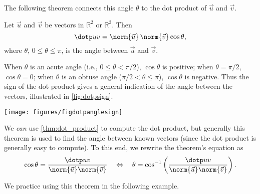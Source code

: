 The following theorem connects this angle $\theta$ to the dot product of $\vec u$ and $\vec v$.

{Let $\vec u$ and $\vec v$ be vectors in $\mathbb{R}^2$ or $\mathbb{R}^3$. Then 
$$\dotp uv = \norm{\vec u}\,\norm{\vec v} \cos\theta,$$
where $\theta$, $0\leq\theta\leq \pi$, is the angle between $\vec u$ and $\vec v$.
}

When $\theta$ is an acute angle (i.e., $0\leq \theta <\pi/2$), $\cos \theta$ is positive; when $\theta = \pi/2$, $\cos \theta = 0$; when $\theta$ is an obtuse angle ($\pi/2<\theta \leq \pi$), $\cos \theta$ is negative. Thus the sign of the dot product gives a general indication of the angle between the vectors, illustrated in \autoref{fig:dotpsign}.

\begin{lxfigure}
\begin{center}
\texttt{[image: figures/figdotpanglesign]}
\label{fig:dotpsign}
\end{center}
\end{lxfigure}

We \emph{can} use \autoref{thm:dot_product} to compute the dot product, but generally this theorem is used to find the angle between known vectors (since the dot product is generally easy to compute). To this end, we rewrite the theorem's equation as
$$\cos \theta = \frac{\dotp uv}{\norm{\vec u}\norm{\vec v}} \quad \Leftrightarrow \quad \theta = \cos^{-1}\left(\frac{\dotp uv}{\norm{\vec u}\norm{\vec v}}\right).$$


We practice using this theorem in the following example.


